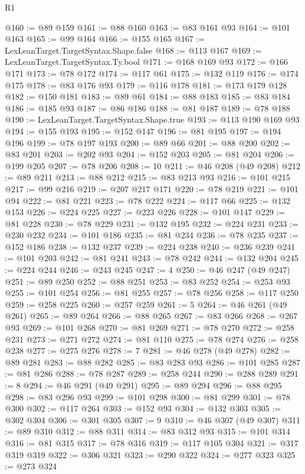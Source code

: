 \begin{lexlean}{R1}
\begin{coremodule}
@160 := @89 @159
@161 := @88 @160
@163 := @83 @161 @93
@164 := @101 @163
@165 := @99 @164
@166 := @155 @165
@167 := LexLeanTarget.TargetSyntax.Shape.false
@168 := @113 @167
@169 := LexLeanTarget.TargetSyntax.Ty.bool
@171 := @168 @169 @93
@172 := @166 @171
@173 := @78 @172
@174 := @117 @61
@175 := @132 @119
@176 := @174 @175
@178 := @83 @176 @93
@179 := @116 @178
@181 := @173 @179 @128
@182 := @150 @181
@183 := @89 @61
@184 := @88 @183
@185 := @83 @184
@186 := @185 @93
@187 := @86 @186
@188 := @81 @187
@189 := @78 @188
@190 := LexLeanTarget.TargetSyntax.Shape.true
@193 := @113 @190 @169 @93
@194 := @155 @193
@195 := @152 @147
@196 := @81 @195
@197 := @194 @196
@199 := @78 @197 @193
@200 := @89 @66
@201 := @88 @200
@202 := @83 @201
@203 := @202 @93
@204 := @152 @203
@205 := @81 @204
@206 := @199 @205
@207 := @78 @206
@208 := 10
@211 := @46 @208 (@49 @208)
@212 := @89 @211
@213 := @88 @212
@215 := @83 @213 @93
@216 := @101 @215
@217 := @99 @216
@219 := @207 @217 @171
@220 := @78 @219
@221 := @101 @94
@222 := @81 @221
@223 := @78 @222
@224 := @117 @66
@225 := @132 @153
@226 := @224 @225
@227 := @223 @226
@228 := @101 @147
@229 := @81 @228
@230 := @78 @229
@231 := @132 @195
@232 := @224 @231
@233 := @230 @232
@234 := @101 @186
@235 := @81 @234
@236 := @78 @235
@237 := @152 @186
@238 := @132 @237
@239 := @224 @238
@240 := @236 @239
@241 := @101 @203
@242 := @81 @241
@243 := @78 @242
@244 := @132 @204
@245 := @224 @244
@246 := @243 @245
@247 := 4
@250 := @46 @247 (@49 @247)
@251 := @89 @250
@252 := @88 @251
@253 := @83 @252
@254 := @253 @93
@255 := @101 @254
@256 := @81 @255
@257 := @78 @256
@258 := @117 @250
@259 := @258 @225
@260 := @257 @259
@261 := 5
@264 := @46 @261 (@49 @261)
@265 := @89 @264
@266 := @88 @265
@267 := @83 @266
@268 := @267 @93
@269 := @101 @268
@270 := @81 @269
@271 := @78 @270
@272 := @258 @231
@273 := @271 @272
@274 := @81 @110
@275 := @78 @274
@276 := @258 @238
@277 := @275 @276
@278 := 7
@281 := @46 @278 (@49 @278)
@282 := @89 @281
@283 := @88 @282
@285 := @83 @283 @93
@286 := @101 @285
@287 := @81 @286
@288 := @78 @287
@289 := @258 @244
@290 := @288 @289
@291 := 8
@294 := @46 @291 (@49 @291)
@295 := @89 @294
@296 := @88 @295
@298 := @83 @296 @93
@299 := @101 @298
@300 := @81 @299
@301 := @78 @300
@302 := @117 @264
@303 := @152 @93
@304 := @132 @303
@305 := @302 @304
@306 := @301 @305
@307 := 9
@310 := @46 @307 (@49 @307)
@311 := @89 @310
@312 := @88 @311
@314 := @83 @312 @93
@315 := @101 @314
@316 := @81 @315
@317 := @78 @316
@319 := @117 @105 @304
@321 := @317 @319 @319
@322 := @306 @321
@323 := @290 @322
@324 := @277 @323
@325 := @273 @324

\end{coremodule}
\end{lexlean}
